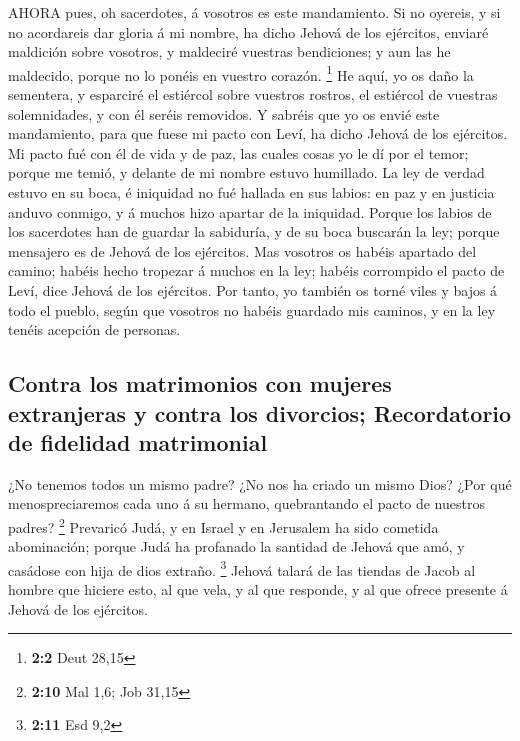  AHORA pues, oh sacerdotes, á vosotros es este mandamiento.
 Si no oyereis, y si no acordareis dar gloria á mi nombre,
ha dicho Jehová de los ejércitos, enviaré maldición sobre vosotros, y
maldeciré vuestras bendiciones; y aun las he maldecido, porque no lo
ponéis en vuestro corazón. \footnote{\textbf{2:2} Deut 28,15}
 He aquí, yo os daño la sementera, y esparciré el estiércol
sobre vuestros rostros, el estiércol de vuestras solemnidades, y con él
seréis removidos.  Y sabréis que yo os envié este
mandamiento, para que fuese mi pacto con Leví, ha dicho Jehová de los
ejércitos.  Mi pacto fué con él de vida y de paz, las cuales
cosas yo le dí por el temor; porque me temió, y delante de mi nombre
estuvo humillado.  La ley de verdad estuvo en su boca, é
iniquidad no fué hallada en sus labios: en paz y en justicia anduvo
conmigo, y á muchos hizo apartar de la iniquidad.  Porque
los labios de los sacerdotes han de guardar la sabiduría, y de su boca
buscarán la ley; porque mensajero es de Jehová de los ejércitos.
 Mas vosotros os habéis apartado del camino; habéis hecho
tropezar á muchos en la ley; habéis corrompido el pacto de Leví, dice
Jehová de los ejércitos.  Por tanto, yo también os torné
viles y bajos á todo el pueblo, según que vosotros no habéis guardado
mis caminos, y en la ley tenéis acepción de personas.

\hypertarget{contra-los-matrimonios-con-mujeres-extranjeras-y-contra-los-divorcios-recordatorio-de-fidelidad-matrimonial}{%
\subsection{Contra los matrimonios con mujeres extranjeras y contra los
divorcios; Recordatorio de fidelidad
matrimonial}\label{contra-los-matrimonios-con-mujeres-extranjeras-y-contra-los-divorcios-recordatorio-de-fidelidad-matrimonial}}

 ¿No tenemos todos un mismo padre? ¿No nos ha criado un
mismo Dios? ¿Por qué menospreciaremos cada uno á su hermano,
quebrantando el pacto de nuestros padres? \footnote{\textbf{2:10} Mal
  1,6; Job 31,15}  Prevaricó Judá, y en Israel y en
Jerusalem ha sido cometida abominación; porque Judá ha profanado la
santidad de Jehová que amó, y casádose con hija de dios extraño.
\footnote{\textbf{2:11} Esd 9,2}  Jehová talará de las
tiendas de Jacob al hombre que hiciere esto, al que vela, y al que
responde, y al que ofrece presente á Jehová de los ejércitos.

